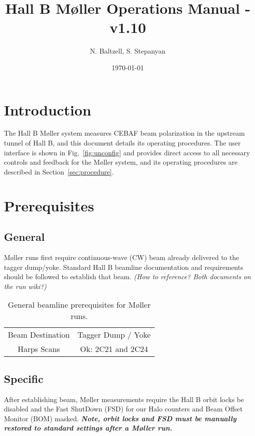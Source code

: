 \documentclass[amsmath,amssymb,notitlepage,12pt]{revtex4}
\begin{document}
\title{Hall B M{\o}ller Operations Manual - v1.10}
\date{\today}
\author{N. Baltzell, S. Stepanyan}
\begin{abstract}
\end{abstract}
\maketitle

\section{Introduction}
The Hall B M{\o}ller system measures CEBAF beam polarization in the upstream tunnel of Hall B, and this document details its operating procedures.  The user interface is shown in Fig.~\ref{fig:unconfig} and provides direct access to all necessary controls and feedback for the M{\o}ller system, and its operating procedures are described in Section~\ref{sec:procedure}.

\section{Prerequisites}\label{sec:prereq}
\subsection{General}
M{\o}ller runs first require continuous-wave (CW) beam already delivered to the tagger dump/yoke.  Standard Hall B beamline documentation and requirements should be followed to establish that beam.  {\em (How to reference?  Both documents on the run wiki?)}

\begin{table}[htbp]\centering
    \begin{tabular}{c|c}\toprule[1.5pt]
        Beam Destination & Tagger Dump / Yoke \\
        Harps Scans & Ok: 2C21 and 2C24\\ 
        \bottomrule[1.5pt]
    \end{tabular}
    \caption{General beamline prerequisites for M{\o}ller runs.}
\end{table}

\subsection{Specific}
After establishing beam, M{\o}ller measurements require the Hall B orbit locks be disabled and the Fast ShutDown (FSD) for our Halo counters and Beam Offset Monitor (BOM) masked.  {\bf\em Note, orbit locks and FSD must be manually restored to standard settings after a M{\o}ller run.}
\end{document}

